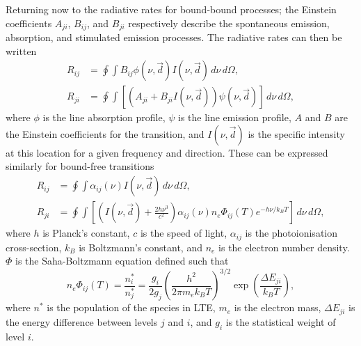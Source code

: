 Returning now to the radiative rates for bound-bound processes; the Einstein coefficients $A_{ji}$, $B_{ij}$, and $B_{ji}$ respectively describe the spontaneous emission, absorption, and stimulated emission processes.
The radiative rates can then be written
\begin{align}
    R_{ij} &= \oint \int B_{ij} \phi(\nu, \vec{d}) I(\nu, \vec{d})\,d\nu\,d\Omega,\\
    R_{ji} &= \oint \int \left[\left(A_{ji} + B_{ji} I(\nu, \vec{d})\right)\psi(\nu, \vec{d}) \right]\,d\nu\,d\Omega,
    \label{Eq:BbRates}
\end{align}
where $\phi$ is the line absorption profile, $\psi$ is the line emission profile, $A$ and $B$ are the Einstein coefficients for the transition, and $I(\nu, \vec{d})$ is the specific intensity at this location for a given frequency and direction.
These can be expressed similarly for bound-free transitions
\begin{align}
    R_{ij} &= \oint \int \alpha_{ij}(\nu) I(\nu, \vec{d})\,d\nu\,d\Omega,\\
    R_{ji} &= \oint \int \left[\left(I(\nu, \vec{d}) + \frac{2h\nu^3}{c^2}\right) \alpha_{ij}(\nu)n_e\Phi_{ij}(T) e^{-h\nu/k_B T} \right]\,d\nu\,d\Omega,
\end{align}
where $h$ is Planck's constant, $c$ is the speed of light, $\alpha_{ij}$ is the photoionisation cross-section, $k_B$ is Boltzmann's constant, and $n_e$ is the electron number density.
$\Phi$ is the Saha-Boltzmann equation defined such that
\begin{equation}
    n_e\Phi_{ij}(T) = \frac{n^*_i}{n^*_j} = \frac{g_i}{2g_j}\left( \frac{h^2}
    {2\pi m_e k_B T} \right)^{3/2} \exp{\left(  \frac{\Delta E_{ji}}{k_B T}\right)},
\end{equation}
where $n^*$ is the population of the species in LTE, $m_e$ is the electron mass, $\Delta E_{ji}$ is the energy difference between levels $j$ and $i$, and $g_i$ is the statistical weight of level $i$.

